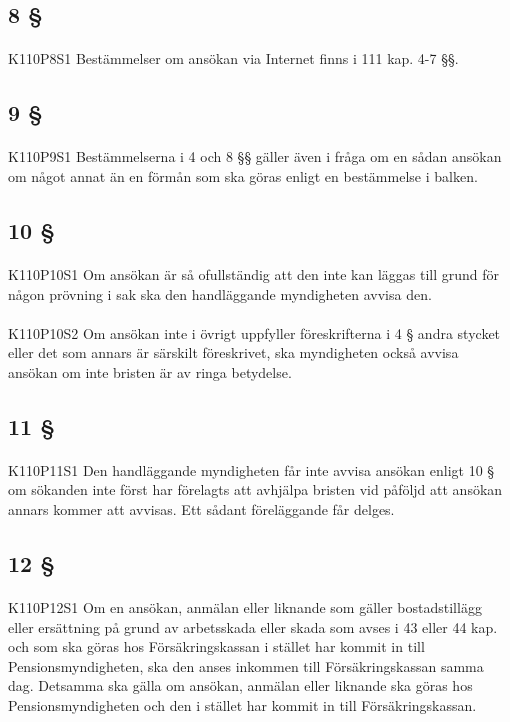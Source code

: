 \documentclass[a4paper,notitlepage,openany,10pt]{book}
\begin{document}
\subsection*{8 §}
\paragraph*{}
{\tiny K110P8S1}
Bestämmelser om ansökan via Internet finns i 111 kap. 4-7 §§.
\subsection*{9 §}
\paragraph*{}
{\tiny K110P9S1}
Bestämmelserna i 4 och 8 §§ gäller även i fråga om en sådan ansökan om något annat än en förmån som ska göras enligt en bestämmelse i balken.
\subsection*{10 §}
\paragraph*{}
{\tiny K110P10S1}
Om ansökan är så ofullständig att den inte kan läggas till grund för någon prövning i sak ska den handläggande myndigheten avvisa den.
\paragraph*{}
{\tiny K110P10S2}
Om ansökan inte i övrigt uppfyller föreskrifterna i 4 § andra stycket eller det som annars är särskilt föreskrivet, ska myndigheten också avvisa ansökan om inte bristen är av ringa betydelse.
\subsection*{11 §}
\paragraph*{}
{\tiny K110P11S1}
Den handläggande myndigheten får inte avvisa ansökan enligt 10 § om sökanden inte först har förelagts att avhjälpa bristen vid påföljd att ansökan annars kommer att avvisas.
Ett sådant föreläggande får delges.
\subsection*{12 §}
\paragraph*{}
{\tiny K110P12S1}
Om en ansökan, anmälan eller liknande som gäller bostadstillägg eller ersättning på grund av arbetsskada eller skada som avses i 43 eller 44 kap. och som ska göras hos Försäkringskassan i stället har kommit in till Pensionsmyndigheten, ska den anses inkommen till Försäkringskassan samma dag. Detsamma ska gälla om ansökan, anmälan eller liknande ska göras hos Pensionsmyndigheten och den i stället har kommit in till Försäkringskassan.
\end{document}
